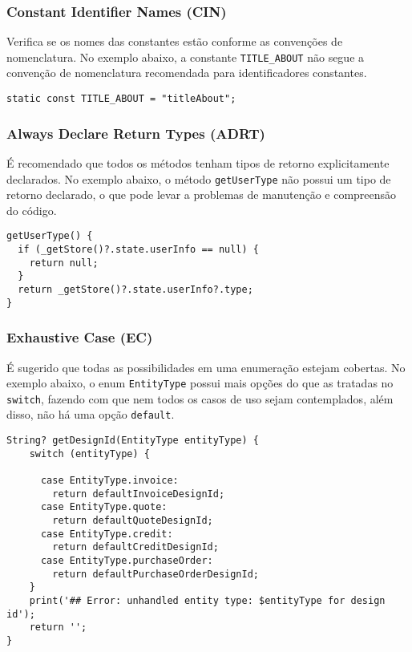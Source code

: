 \documentclass[12pt]{article}
\begin{document}
\subsubsection{Constant Identifier Names (CIN)}
Verifica se os nomes das constantes estão conforme as convenções de nomenclatura. No exemplo abaixo, a constante \texttt{TITLE\_ABOUT} não segue a convenção de nomenclatura recomendada para identificadores constantes.

\begin{tcolorbox}[codeSnippetStyle={WhatTodo/lib/utils/keys.dart}]
\begin{verbatim}
static const TITLE_ABOUT = "titleAbout";
\end{verbatim}
\end{tcolorbox}

\subsubsection{Always Declare Return Types (ADRT)}
É recomendado que todos os métodos tenham tipos de retorno explicitamente declarados. No exemplo abaixo, o método \texttt{getUserType} não possui um tipo de retorno declarado, o que pode levar a problemas de manutenção e compreensão do código.

\begin{tcolorbox}[codeSnippetStyle={gsy\_github\_app\_flutter/lib/page/my\_page.dart}]
\begin{verbatim}
getUserType() {
  if (_getStore()?.state.userInfo == null) {
    return null;
  }
  return _getStore()?.state.userInfo?.type;
}
\end{verbatim}
\end{tcolorbox}

\subsubsection{Exhaustive Case (EC)}
É sugerido que todas as possibilidades em uma enumeração estejam cobertas. No exemplo abaixo, o enum \texttt{EntityType} possui mais opções do que as tratadas no \texttt{switch}, fazendo com que nem todos os casos de uso sejam contemplados, além disso, não há uma opção \texttt{default}.

\begin{tcolorbox}[codeSnippetStyle={gsy\_github\_app\_flutter/lib/page/my\_page.dart}]
\begin{verbatim}
String? getDesignId(EntityType entityType) {
    switch (entityType) {
    
      case EntityType.invoice:
        return defaultInvoiceDesignId;
      case EntityType.quote:
        return defaultQuoteDesignId;
      case EntityType.credit:
        return defaultCreditDesignId;
      case EntityType.purchaseOrder:
        return defaultPurchaseOrderDesignId;
    }
    print('## Error: unhandled entity type: $entityType for design id');
    return '';
}
\end{verbatim}
\end{tcolorbox}
\end{document}
